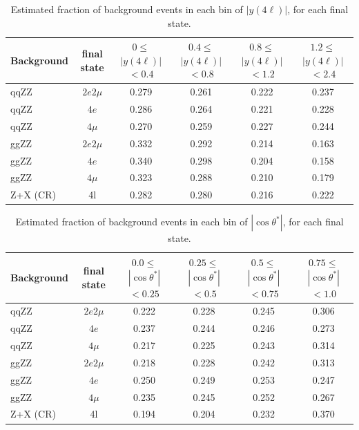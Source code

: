 \begin{table}[!h!tb]  
\begin{center}  
\small  
    \caption{  
        Estimated fraction of background events in each bin of $|y(4\ell)|$, for each final state.  
\label{tab:fractions_rapidity4l}  
}  
\begin{tabular}{|l|c|c|c|c|c|}  
\hline  
Background & final state & $0\leq$$|y(4\ell)|$$<0.4$ & $0.4\leq$$|y(4\ell)|$$<0.8$ & $0.8\leq$$|y(4\ell)|$$<1.2$ & $1.2\leq$$|y(4\ell)|$$<2.4$ \\ \hline  
qqZZ& $2e2\mu$  & 0.279  & 0.261  & 0.222  & 0.237  \\  
qqZZ& $4e$  & 0.286  & 0.264  & 0.221  & 0.228  \\  
qqZZ& $4\mu$  & 0.270  & 0.259  & 0.227  & 0.244  \\  
ggZZ& $2e2\mu$  & 0.332  & 0.292  & 0.214  & 0.163  \\  
ggZZ& $4e$  & 0.340  & 0.298  & 0.204  & 0.158  \\  
ggZZ& $4\mu$  & 0.323  & 0.288  & 0.210  & 0.179  \\  
Z+X (CR)& 4l  & 0.282  & 0.280  & 0.216  & 0.222  \\  
\hline  
\end{tabular}  
\normalsize  
\end{center}  
\end{table}  

\begin{table}[!h!tb]  
\begin{center}  
\small  
    \caption{  
        Estimated fraction of background events in each bin of $|\cos \theta^{*}|$, for each final state.  
\label{tab:fractions_cosThetaStar}  
}  
\begin{tabular}{|l|c|c|c|c|c|}  
\hline  
Background & final state & $0.0\leq$$|\cos \theta^{*}|$$<0.25$ & $0.25\leq$$|\cos \theta^{*}|$$<0.5$ & $0.5\leq$$|\cos \theta^{*}|$$<0.75$ & $0.75\leq$$|\cos \theta^{*}|$$<1.0$ \\ \hline  
qqZZ& $2e2\mu$  & 0.222  & 0.228  & 0.245  & 0.306  \\  
qqZZ& $4e$  & 0.237  & 0.244  & 0.246  & 0.273  \\  
qqZZ& $4\mu$  & 0.217  & 0.225  & 0.243  & 0.314  \\  
ggZZ& $2e2\mu$  & 0.218  & 0.228  & 0.242  & 0.313  \\  
ggZZ& $4e$  & 0.250  & 0.249  & 0.253  & 0.247  \\  
ggZZ& $4\mu$  & 0.235  & 0.245  & 0.252  & 0.267  \\  
Z+X (CR)& 4l  & 0.194  & 0.204  & 0.232  & 0.370  \\  
\hline  
\end{tabular}  
\normalsize  
\end{center}  
\end{table} 

